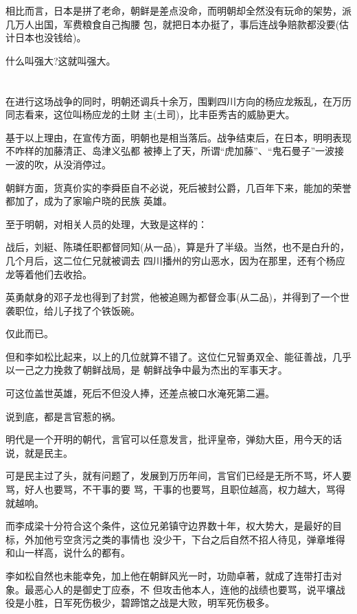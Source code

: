 \documentclass[11pt,a4paper,onecolumn]{article}
\begin{document}
相比而言，日本是拼了老命，朝鲜是差点没命，而明朝却全然没有玩命的架势，派几万人出国，军费粮食自己掏腰
包，就把日本办挺了，事后连战争赔款都没要(估计日本也没钱给)。

什么叫强大?这就叫强大。

\section[\thesection]{}

在进行这场战争的同时，明朝还调兵十余万，围剿四川方向的杨应龙叛乱，在万历同志看来，这位叫杨应龙的土财
主(土司)，比丰臣秀吉的威胁更大。

基于以上理由，在宣传方面，明朝也是相当落后。战争结束后，在日本，明明表现不咋样的加藤清正、岛津义弘都
被捧上了天，所谓``虎加藤''、``鬼石曼子''一波接一波的吹，从没消停过。

朝鲜方面，货真价实的李舜臣自不必说，死后被封公爵，几百年下来，能加的荣誉都加了，成为了家喻户晓的民族
英雄。

至于明朝，对相关人员的处理，大致是这样的：

战后，刘綎、陈璘任职都督同知(从一品)，算是升了半级。当然，也不是白升的，几个月后，这二位仁兄就被调去
四川播州的穷山恶水，因为在那里，还有个杨应龙等着他们去收拾。

英勇献身的邓子龙也得到了封赏，他被追赐为都督佥事(从二品)，并得到了一个世袭职位，给儿子找了个铁饭碗。

仅此而已。

但和李如松比起来，以上的几位就算不错了。这位仁兄智勇双全、能征善战，几乎以一己之力挽救了朝鲜战局，是
朝鲜战争中最为杰出的军事天才。

可这位盖世英雄，死后不但没人捧，还差点被口水淹死第二遍。

说到底，都是言官惹的祸。

明代是一个开明的朝代，言官可以任意发言，批评皇帝，弹劾大臣，用今天的话说，就是民主。

可是民主过了头，就有问题了，发展到万历年间，言官们已经是无所不骂，坏人要骂，好人也要骂，不干事的要
骂，干事的也要骂，且职位越高，权力越大，骂得就越响。

而李成梁十分符合这个条件，这位兄弟镇守边界数十年，权大势大，是最好的目标，外加他亏空贪污之类的事情也
没少干，下台之后自然不招人待见，弹章堆得和山一样高，说什么的都有。

李如松自然也未能幸免，加上他在朝鲜风光一时，功勋卓著，就成了连带打击对象。最恶心人的是御史丁应泰，不
但攻击他本人，连他的战绩也要骂，说平壤战役是小胜，日军死伤极少，碧蹄馆之战是大败，明军死伤极多。
\end{document}
